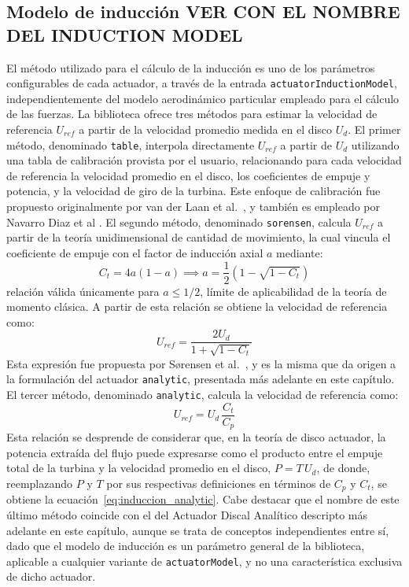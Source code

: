 \subsection{Modelo de inducción \Large VER CON EL NOMBRE DEL INDUCTION MODEL}
El método utilizado para el cálculo de la inducción es uno de los parámetros configurables de cada actuador, a través de la entrada \texttt{actuatorInductionModel}, independientemente del modelo aerodinámico particular empleado para el cálculo de las fuerzas. La biblioteca ofrece tres métodos para estimar la velocidad de referencia $U_{ref}$ a partir de la velocidad promedio medida en el disco $U_d$. El primer método, denominado \texttt{table}, interpola directamente $U_{ref}$ a partir de $U_d$ utilizando una tabla de calibración provista por el usuario, relacionando para cada velocidad de referencia la velocidad promedio en el disco, los coeficientes de empuje y potencia, y la velocidad de giro de la turbina. Este enfoque de calibración fue propuesto originalmente por van der Laan et al.~\citep{vanderlaan2015}, y también es empleado por Navarro Diaz et al \citet{navarrodiaz2019,navarrodiaz2023}. El segundo método, denominado \texttt{sorensen}, calcula $U_{ref}$ a partir de la teoría unidimensional de cantidad de movimiento, la cual vincula el coeficiente de empuje con el factor de inducción axial $a$ mediante:
\begin{equation}
C_t = 4a(1-a) \implies a = \frac{1}{2}\left(1 - \sqrt{1-C_t}\right)
\label{eq:induccion_momentum}
\end{equation}
relación válida únicamente para $a \leq 1/2$, límite de aplicabilidad de la teoría de momento clásica. A partir de esta relación se obtiene la velocidad de referencia como:
\begin{equation}
U_{ref} = \frac{2 U_d}{1 + \sqrt{1 - C_t}}
\label{eq:induccion_uref}
\end{equation}
Esta expresión fue propuesta por Sørensen et al.~\citep{sorensen2020}, y es la misma que da origen a la formulación del actuador \texttt{analytic}, presentada más adelante en este capítulo. El tercer método, denominado \texttt{analytic}, calcula la velocidad de referencia como:
\begin{equation}
U_{ref} = U_d \, \frac{C_t}{C_p}
\label{eq:induccion_analytic}
\end{equation}
Esta relación se desprende de considerar que, en la teoría de disco actuador, la potencia extraída del flujo puede expresarse como el producto entre el empuje total de la turbina y la velocidad promedio en el disco, $P = T \, U_d$, de donde, reemplazando $P$ y $T$ por sus respectivas definiciones en términos de $C_p$ y $C_t$, se obtiene la ecuación~\ref{eq:induccion_analytic}. Cabe destacar que el nombre de este último método coincide con el del Actuador Discal Analítico descripto más adelante en este capítulo, aunque se trata de conceptos independientes entre sí, dado que el modelo de inducción es un parámetro general de la biblioteca, aplicable a cualquier variante de \texttt{actuatorModel}, y no una característica exclusiva de dicho actuador.

